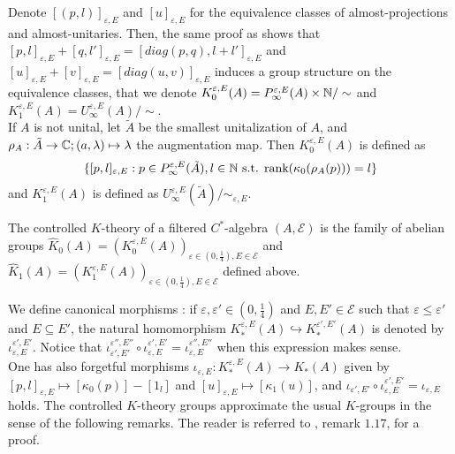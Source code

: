 Denote $[(p,l)]_{\varepsilon,E}$ and $[u]_{\varepsilon,E}$ for the equivalence classes of almost-projections and almost-unitaries. Then, the same proof as \cite{OY2} shows that $[p,l]_{\varepsilon,E}+[q,l']_{\varepsilon,E}=[diag(p,q),l+l']_{\varepsilon,E}$ and $[u]_{\varepsilon,E}+[v]_{\varepsilon,E}=[diag(u,v)]_{\varepsilon,E}$ induces a group structure on the equivalence classes, that we denote $K_0^{\varepsilon,E}(A) = P^{\varepsilon, E}_\infty(A)\times \mathbb N / \sim$ and $K_1^{\varepsilon,E}(A) = U^{\varepsilon, E}_\infty(A) / \sim$.\\

If $A$ is not unital, let $\tilde A$ be the smallest unitalization of $A$, and $\rho_A: \tilde A \rightarrow \mathbb C; (a,\lambda)\mapsto \lambda$ the augmentation map. Then $K_0^{\varepsilon,E}(A)$ is defined as
\[\{[p,l]_{\varepsilon,E} : p\in P^{\varepsilon,E}_\infty (\tilde A), l\in \mathbb N \text{ s.t. rank}(\kappa_0(\rho_A(p)))=l \}\]
and $K_1^{\varepsilon,E}(A)$ is defined as $U_\infty^{\varepsilon,E}(\tilde A)/ \sim_{\varepsilon,E}$.\\

\begin{definition}
The controlled $K$-theory of a filtered $C^*$-algebra $(A,\mathcal E)$ is the family of abelian groups $\hat K_0(A) = (K_0^{\varepsilon,E}(A))_{\varepsilon\in (0,\frac{1}{4}),E\in\mathcal E}$ and $\hat K_1(A) = (K_1^{\varepsilon,E}(A))_{\varepsilon\in (0,\frac{1}{4}),E\in\mathcal E}$ defined above.\\
\end{definition}

We define canonical morphisms : if $\varepsilon, \varepsilon'\in (0,\frac{1}{4})$ and $E,E'\in\mathcal E$ such that $\varepsilon \leq \varepsilon'$ and $E \subseteq E'$, the natural homomorphism $K_*^{\varepsilon,E}(A)\hookrightarrow K_*^{\varepsilon',E'}(A)$ is denoted by $\iota_{\varepsilon,E}^{\varepsilon',E'}$. Notice that $\iota_{\varepsilon',E'}^{\varepsilon'',E''}\circ\iota_{\varepsilon,E}^{\varepsilon',E'}=\iota_{\varepsilon,E}^{\varepsilon'',E''}$ when this expression makes sense.\\

One has also forgetful morphisms $\iota_{\varepsilon,E} : K_*^{\varepsilon,E}(A)\rightarrow K_*(A)$ given by $[p,l]_{\varepsilon,E} \mapsto [\kappa_0(p)]-[1_l]$ and $[u]_{\varepsilon,E} \mapsto [\kappa_1(u)] $, and 
$\iota_{\varepsilon',E'}\circ\iota_{\varepsilon,E}^{\varepsilon',E'}=\iota_{\varepsilon, E}$ holds. The controlled $K$-theory groups approximate the usual $K$-groups in the sense of the following remarks. The reader is referred to \cite{OY2}, remark $1.17$, for a proof.

